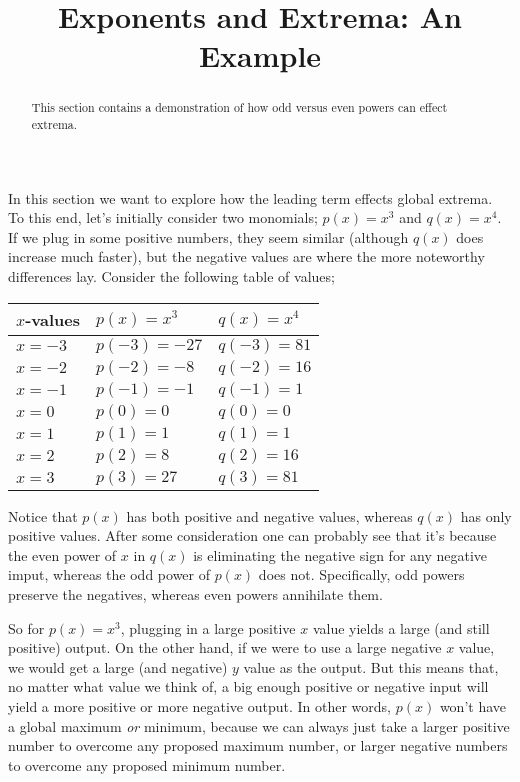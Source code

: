 \documentclass{ximera}
\title{Exponents and Extrema: An Example}
\begin{document}
\begin{abstract}
    This section contains a demonstration of how odd versus even powers can effect extrema.
\end{abstract}
\maketitle


In this section we want to explore how the leading term effects global extrema. To this end, let's initially consider two monomials; $p(x) = x^3$ and $q(x) = x^4$. If we plug in some positive numbers, they seem similar (although $q(x)$ does increase much faster), but the negative values are where the more noteworthy differences lay. Consider the following table of values;\\

\begin{center}
    \begin{tabular}{| l l l |}\hline
        $x$-values      & $p(x) = x^3$      & $q(x) = x^4$  \\ \hline
        $x = -3$        & $p(-3) = -27$     & $q(-3) = 81$  \\
        $x = -2$        & $p(-2) = -8$      & $q(-2) = 16$  \\
        $x = -1$        & $p(-1) = -1$       & $q(-1) = 1$   \\
        $x = 0$         & $p(0) = 0$        & $q(0) = 0$    \\
        $x = 1$         & $p(1) = 1$        & $q(1) = 1$    \\
        $x = 2$         & $p(2) = 8$        & $q(2) = 16$   \\
        $x = 3$         & $p(3) = 27$       & $q(3) = 81$   \\\hline
    \end{tabular}
\end{center}

Notice that $p(x)$ has both positive and negative values, whereas $q(x)$ has only positive values. After some consideration one can probably see that it's because the even power of $x$ in $q(x)$ is eliminating the negative sign for any negative imput, whereas the odd power of $p(x)$ does not. Specifically, odd powers preserve the negatives, whereas even powers annihilate them.

So for $p(x) = x^3$, plugging in a large positive $x$ value yields a large (and still positive) output. On the other hand, if we were to use a large negative $x$ value, we would get a large (and negative) $y$ value as the output. But this means that, no matter what value we think of, a big enough positive or negative input will yield a more positive or more negative output. In other words, $p(x)$ won't have a global maximum \textit{or} minimum, because we can always just take a larger positive number to overcome any proposed maximum number, or larger negative numbers to overcome any proposed minimum number.
\end{document}
